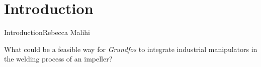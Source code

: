 \section{Introduction}

\begin{frame}{Introduction}{Rebecca Malihi}


\begin{center}
What could be a feasible way for \textit{Grundfos} to integrate industrial manipulators in the welding process of an impeller?
\end{center}






\end{frame}